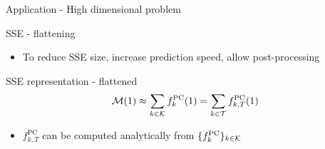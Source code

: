 \documentclass{rsuqbeamernew}
\newcommand{\BParams}{1}
\begin{document}
\begin{frame}[t]{Application - High dimensional problem}
	\small
	\\
	\centering
\end{frame}

\begin{frame}[t]{SSE - flattening}
	\small
	\begin{itemize}
		\item[]  To reduce SSE {\altx size}, increase {\altx prediction speed}, 
		allow {\altx post-processing}
	\end{itemize}
	\begin{center}
		\raisebox{5em}{$\Rightarrow$}
	\end{center}
	
	\pause
	\begin{block}{SSE representation - flattened}
		\begin{equation*}
		\cm(\BParams) \approx \sum_{k\in\ck}f_k^{\mathrm{PC}}(\BParams) = 
		\sum_{k\in\ct}f_{k,T}^{\mathrm{PC}}(\BParams)
		\end{equation*}
		
		\begin{itemize}
			\item[] $f_{k,T}^{\mathrm{PC}}$ can be computed {\altx 
				analytically} from $\{f_{k}^{\mathrm{PC}}\}_{k\in{\mathcal K}}$
		\end{itemize}
	\end{block}
\end{frame}

\end{document}
